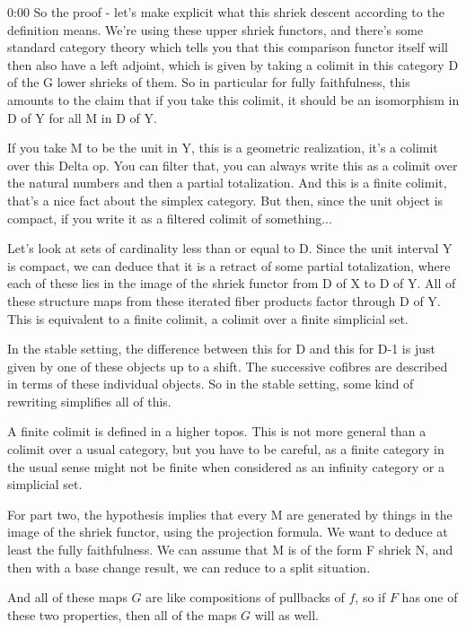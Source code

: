 \begin{unfinished}{0:00}
So the proof - let's make explicit what this shriek descent according to the definition means. We're using these upper shriek functors, and there's some standard category theory which tells you that this comparison functor itself will then also have a left adjoint, which is given by taking a colimit in this category D of the G lower shrieks of them. So in particular for fully faithfulness, this amounts to the claim that if you take this colimit, it should be an isomorphism in D of Y for all M in D of Y.

If you take M to be the unit in Y, this is a geometric realization, it's a colimit over this Delta op. You can filter that, you can always write this as a colimit over the natural numbers and then a partial totalization. And this is a finite colimit, that's a nice fact about the simplex category. But then, since the unit object is compact, if you write it as a filtered colimit of something...

Let's look at sets of cardinality less than or equal to D. Since the unit interval Y is compact, we can deduce that it is a retract of some partial totalization, where each of these lies in the image of the shriek functor from D of X to D of Y. All of these structure maps from these iterated fiber products factor through D of Y. This is equivalent to a finite colimit, a colimit over a finite simplicial set. 

In the stable setting, the difference between this for D and this for D-1 is just given by one of these objects up to a shift. The successive cofibres are described in terms of these individual objects. So in the stable setting, some kind of rewriting simplifies all of this.

A finite colimit is defined in a higher topos. This is not more general than a colimit over a usual category, but you have to be careful, as a finite category in the usual sense might not be finite when considered as an infinity category or a simplicial set.

For part two, the hypothesis implies that every M are generated by things in the image of the shriek functor, using the projection formula. We want to deduce at least the fully faithfulness. We can assume that M is of the form F shriek N, and then with a base change result, we can reduce to a split situation.

And all of these maps $G$ are like compositions of pullbacks of $f$, so if $F$ has one of these two properties, then all of the maps $G$ will as well.


\end{unfinished}
